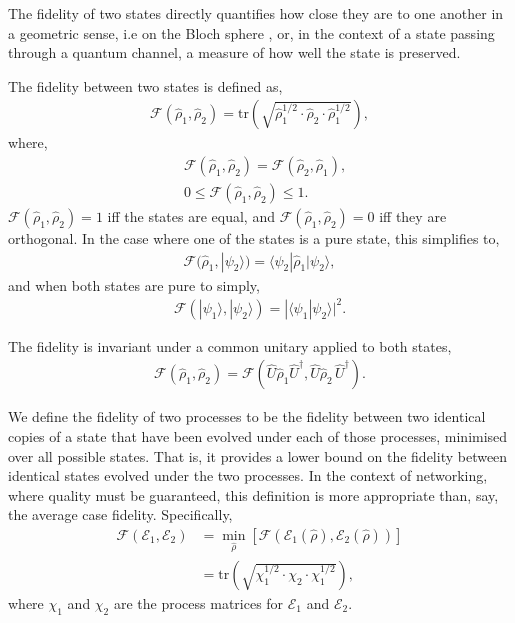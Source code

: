 \documentclass[aps,rmp,twocolumn,amsmath,amssymb,nofootinbib,superscriptaddress]{revtex4}
\newcommand{\bra}[1]{\langle#1|}
\newcommand{\ket}[1]{|#1\rangle}
\newcommand{\comment}[1]{{\color{blue}{\textbf{#1}}}}
\begin{document}
The fidelity of two states directly quantifies how close they are to one another in a geometric sense, i.e on the Bloch sphere \cite{???}, or, in the context of a state passing through a quantum channel, a measure of how well the state is preserved.

The fidelity between two states is defined as,
\begin{align}
\mathcal{F}(\hat\rho_1,\hat\rho_2) = \mathrm{tr}\left(\sqrt{\hat\rho_1^{1/2}\cdot\hat\rho_2\cdot\hat\rho_1^{1/2}}\right),
\end{align}
where,
\begin{align}
& \mathcal{F}(\hat\rho_1,\hat\rho_2) = \mathcal{F}(\hat\rho_2,\hat\rho_1), \nonumber \\
& 0\leq \mathcal{F}(\hat\rho_1,\hat\rho_2) \leq 1.
\end{align}
\mbox{$\mathcal{F}(\hat\rho_1,\hat\rho_2)=1$} iff the states are equal, and \mbox{$\mathcal{F}(\hat\rho_1,\hat\rho_2)=0$} iff they are orthogonal.
In the case where one of the states is a pure state, this simplifies to,
\begin{align}
\mathcal{F}(\hat\rho_1,\ket{\psi_2}) = \bra{\psi_2}\hat\rho_1\ket{\psi_2},
\end{align}
and when both states are pure to simply,
\begin{align}
\mathcal{F}(\ket{\psi_1},\ket{\psi_2}) = |\langle\psi_1 | \psi_2\rangle|^2.
\end{align}

The fidelity is invariant under a common unitary applied to both states,
\begin{align}
\mathcal{F}(\hat\rho_1,\hat\rho_2) = \mathcal{F}(\hat{U}\hat\rho_1 \hat{U}^\dag,\hat{U} \hat\rho_2\,\hat{U}^\dag).
\end{align}

We define the fidelity of two processes to be the fidelity between two identical copies of a state that have been evolved under each of those processes, minimised over all possible states. That is, it provides a lower bound on the fidelity between identical states evolved under the two processes. In the context of networking, where quality must be guaranteed, this definition is more appropriate than, say, the average case fidelity. Specifically,
\begin{align}
\mathcal{F}(\mathcal{E}_1,\mathcal{E}_2) &= \min_{\hat\rho} \left[\mathcal{F}(\mathcal{E}_1(\hat\rho),\mathcal{E}_2(\hat\rho))\right] \nonumber \\
&= \mathrm{tr}\left(\sqrt{\chi_1^{1/2}\cdot\chi_2\cdot\chi_1^{1/2}}\right),
\end{align}
\comment{CHECK THIS!} where $\chi_1$ and $\chi_2$ are the process matrices for $\mathcal{E}_1$ and $\mathcal{E}_2$.
\end{document}
